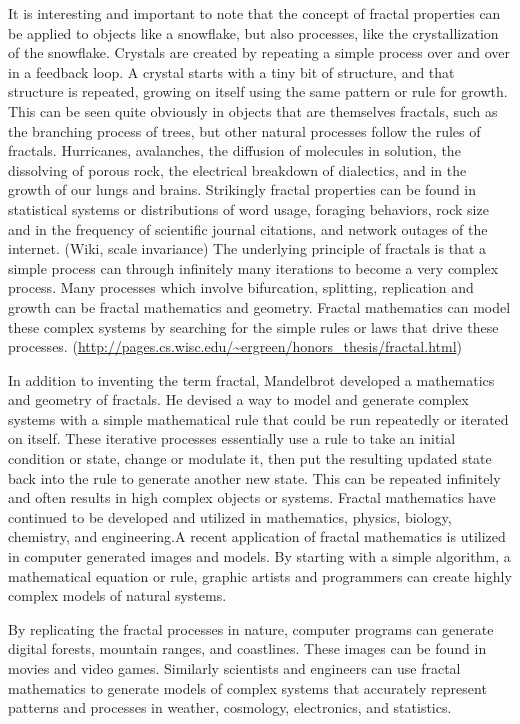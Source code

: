 \documentclass[english,jou]{apa6}
\begin{document}
It is interesting and important to note that the concept of fractal properties can be applied to objects like a snowflake, but also processes, like the crystallization of the snowflake. Crystals are created by repeating a simple process over and over in a feedback loop. A crystal starts with a tiny bit of structure, and that structure is repeated, growing on itself using the same pattern or rule for growth. This can be seen quite obviously in objects that are themselves fractals, such as the branching process of trees, but other natural processes follow the rules of fractals. Hurricanes, avalanches, the diffusion of molecules in solution, the dissolving of porous rock, the electrical breakdown of dialectics, and in the growth of our lungs and brains. Strikingly fractal properties can be found in statistical systems or distributions of word usage, foraging behaviors, rock size and in the frequency of scientific journal citations, and network outages of the internet. (Wiki, scale invariance) The underlying principle of fractals is that a simple process can through infinitely many iterations to become a very complex process. Many processes which involve bifurcation, splitting, replication and growth can be fractal mathematics and geometry. Fractal mathematics can model these complex systems by searching for the simple rules or laws that drive these processes. (\url{http://pages.cs.wisc.edu/~ergreen/honors_thesis/fractal.html})

In addition to inventing the term fractal, Mandelbrot developed a mathematics and geometry of fractals. He devised a way to model and generate complex systems with a simple mathematical rule that could be run repeatedly or iterated on itself. These iterative processes essentially use a rule to take an initial condition or state, change or modulate it, then put the resulting updated state back into the rule to generate another new state. This can be repeated infinitely and often results in high complex objects or systems. Fractal mathematics have continued to be developed and utilized in mathematics, physics, biology, chemistry, and engineering.A recent application of fractal mathematics is utilized in computer generated images and models. By starting with a simple algorithm, a mathematical equation or rule, graphic artists and programmers can create highly complex models of natural systems.

By replicating the fractal processes in nature, computer programs can generate digital forests, mountain ranges, and coastlines. These images can be found in movies and video games. Similarly scientists and engineers can use fractal mathematics to generate models of complex systems that accurately represent patterns and processes in weather, cosmology, electronics, and statistics.
\end{document}
